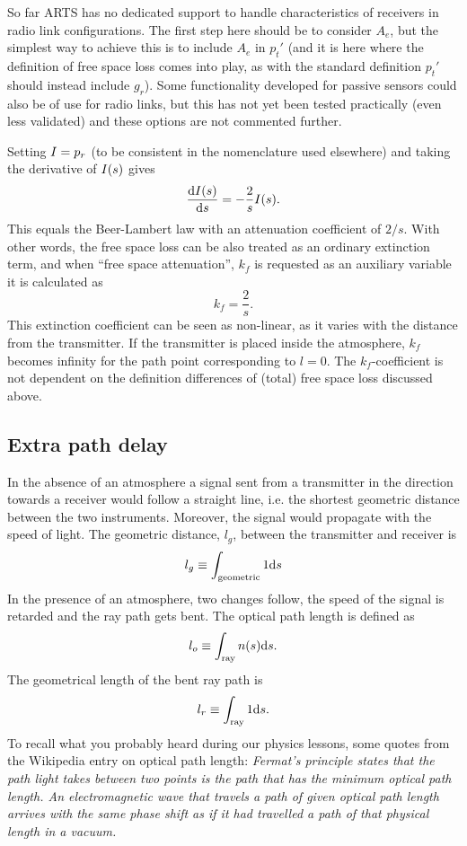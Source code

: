 So far ARTS has no dedicated support to handle characteristics of receivers in
radio link configurations. The first step here should be to consider $A_e$, but
the simplest way to achieve this is to include $A_e$ in $p_t'$ (and it is here
where the definition of free space loss comes into play, as with the standard
definition $p_t'$ should instead include $g_r$). Some functionality developed
for passive sensors could also be of use for radio links, but this has not yet
been tested practically (even less validated) and these options are not
commented further.

Setting $I=p_r$ (to be consistent in the nomenclature used elsewhere) and
taking the derivative of \(I(s)\) gives
\begin{equation}
\label{eq:fsplarts}
 \frac{\mathrm{d}I(s)}{\mathrm{d} s}=-\frac{2}{s}I(s).
\end{equation}
This equals the Beer-Lambert law with an attenuation coefficient of $2/s$. With
other words, the free space loss can be also treated as an ordinary extinction
term, and when ``free space attenuation'', $k_f$ is requested as an auxiliary
variable it is calculated as
\begin{equation}
 k_f=\frac{2}{s}.
\end{equation}
This extinction coefficient can be seen as non-linear, as it varies with the
distance from the transmitter. If the transmitter is placed inside the
atmosphere, $k_f$ becomes infinity for the path point corresponding to $l=0$.
The $k_f$-coefficient is not dependent on the definition differences of (total)
free space loss discussed above.


\subsection{Extra path delay}
%
In the absence of an atmosphere a signal sent from a transmitter in the
direction towards a receiver would follow a straight line, i.e. the shortest
geometric distance between the two instruments. Moreover, the signal would
propagate with the speed of light. The geometric distance, $l_g$, between the
transmitter and receiver is
\begin{equation}
l_g\equiv\int_{\mathrm{geometric}}1\mathrm{d} s
\end{equation}
In the presence of an atmosphere, two changes follow,
the speed of the signal is retarded and the ray path gets 
bent. The optical path length is defined as
\begin{equation}
l_o\equiv\int_{\mathrm{ray}}n(s)\mathrm{d} s.
\end{equation}
The geometrical length of the bent ray path is
\begin{equation}
l_r\equiv\int_{\mathrm{ray}}1\mathrm{d} s.
\label{eq:rlink:lr}
\end{equation}
To recall what you probably heard during our physics lessons, some quotes from
the Wikipedia entry on optical path length: \emph{Fermat's principle states
  that the path light takes between two points is the path that has the minimum
  optical path length. An electromagnetic wave that travels a path of given
  optical path length arrives with the same phase shift as if it had travelled
  a path of that physical length in a vacuum.}

